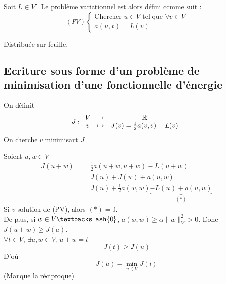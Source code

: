 Soit $L\in V'$. Le problème variationnel est alors défini comme suit :
\[(PV)\left\{\begin{array}{c} \text{Chercher } u\in V \text{ tel que } \forall v\in V \\
a(u,v)=L(v) \end{array}\right. \]


\begin{dem}
Distribuée sur feuille.
\end{dem}


\subsection{Ecriture sous forme d'un problème de minimisation d'une fonctionnelle d'énergie}
On définit \[J:\begin{array}{c c c} V &\to& \mathbb{R} \\ v&\mapsto& J(v)=\frac{1}{2}a(v,v)-L(v) \end{array}\]
On cherche $v$ minimisant $J$


\begin{dem}
Soient $u,w\in V$
\begin{eqnarray*}
	J(u+w)&=&\frac{1}{2}a(u+w,u+w)-L(u+w)\\
		&=&J(u)+J(w)+a(u,w)\\
		&=&J(u)+\frac{1}{2}a(w,w)\underbrace{-L(w)+a(u,w)}_{(*)}
\end{eqnarray*}
Si $v$ solution de (PV), alors $(*)=0$.\\
De plus, si $w\in V\textbackslash\{0\}$, $a(w,w)\geq \alpha\|w\|^2_V >0$. Donc $J(u+w)\geq J(u)$.\\
$\forall t\in V$, $\exists u,w\in V$, $u+w=t$\\
	\[J(t)\geq J(u)\]
D'où \[J(u)=\min_{u\in V} J(t)\]
(Manque la réciproque)
\end{dem}

